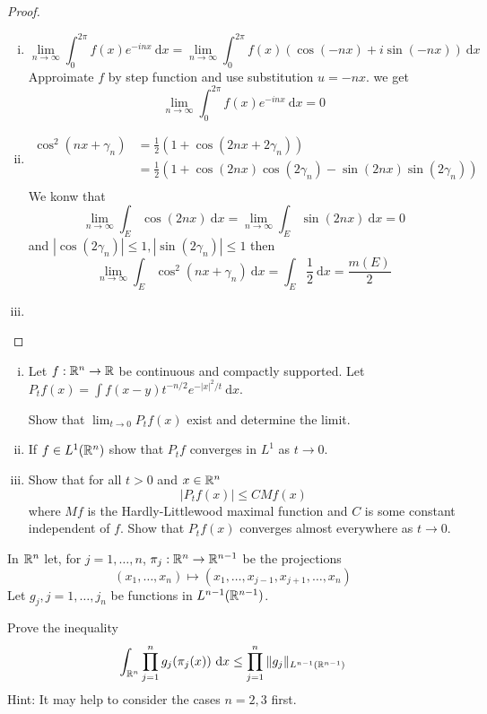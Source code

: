 \begin{proof}
  \begin{enumerate}[(i)]
    \item 
    \[\lim_{n\to\infty} \int_0^{2\pi} f(x) e^{-inx} \ \mathrm{d}x = \lim_{n\to\infty} \int_0^{2\pi} f(x) (\cos(-nx) + i\sin(-nx)) \ \mathrm{d}x\]
    Approimate $f$ by step function and use substitution $u = -nx$. we get
    \[\lim_{n\to\infty} \int_0^{2\pi} f(x) e^{-inx} \ \mathrm{d}x = 0\]
    \item \begin{align*}
      \cos^2(nx + \gamma_n) &= \frac12(1 + \cos(2nx + 2\gamma_n))\\
      &= \frac12(1 + \cos(2nx)\cos(2\gamma_n) - \sin(2nx)\sin(2\gamma_n))\\
    \end{align*}
    We konw that 
    \[\lim_{n\to \infty}\int_E \cos(2nx) \ \mathrm{d}x = \lim_{n\to \infty}\int_E \sin(2nx) \ \mathrm{d}x = 0\]
    and $|\cos(2\gamma_n)| \le 1, |\sin(2\gamma_n)| \le 1$ then
    \[\lim_{n\to\infty}\int_E \cos^2(nx + \gamma_n)\ \mathrm{d}x = \int_E \frac12 \ \mathrm{d}x = \frac{m(E)}{2}\]
    \item 
  \end{enumerate}
\end{proof}

\begin{problem}
  \begin{enumerate}[(i)]
    \item Let $f: \mathbb R^n \to \mathbb R$ be continuous and compactly supported. 
    Let $P_tf(x) = \int f(x-y)t^{-n/2}e^{-|x|^2/t} \ \mathrm{d}x$.

    Show that $\lim_{t\to 0} P_tf(x)$ exist and determine the limit.
    \item If $f \in L^1(\mathbb R^n)$ show that $P_tf$ converges in $L^1$ as $t\to 0$.
    \item Show that for all $t> 0$ and $x \in \mathbb R^n$
    \[|P_tf(x)| \le CM f(x)\]
    where $Mf$ is the Hardly-Littlewood maximal function and $C$ is some constant independent of $f$.
    Show that $P_tf(x)$ converges almost everywhere as $t\to 0$.
  \end{enumerate}
\end{problem}

\begin{problem}
  In $\mathbb R^n$ let, for $j = 1, \dotsc, n$, $\pi_j: \mathbb R^n \to \mathbb R^{n-1}$ be the projections
  \[(x_1, \dotsc, x_n) \mapsto (x_1, \dotsc, x_{j-1}, x_{j+1}, \dotsc, x_n)\]
  Let $g_j, j=1, \dotsc,j_n$ be functions in $L^{n-1}(\mathbb R^{n-1})$.

  Prove the inequality
  \[\int_{\mathbb R^n} \prod_{j=1}^n g_j(\pi_j(x))\ \mathrm{d}x \le \prod_{j=1}^n \|g_j\|_{L^{n-1}(\mathbb R^{n-1})}\]
  Hint: It may help to consider the cases $n=2,3$ first.
\end{problem}

